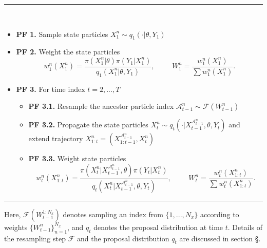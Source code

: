 \documentclass[a4paper,12pt]{article}
\begin{document}
\noindent \rule{\textwidth}{1pt}\\

\begin{itemize}
\item {\bf PF 1.} Sample state particles $X_1^n \sim q_1(\cdot \vert \theta, Y_1)$
\item {\bf PF 2.} Weight the state particles
\[ w_1^n (X_1^n) = \frac{\pi(X_1^n \vert \theta) \pi(Y_1 \vert X_1^n)}{q_1(X_1^n \vert \theta, Y_1)}, \hspace{1cm} W_1^{n} = \frac{w_1^n (X_1^n)}{\sum w_1^n (X_1^n)}.\]
\item {\bf PF 3.} For time index $t=2,...,T$
\begin{itemize}
\item {\bf PF 3.1.} Resample the ancestor particle index $\mathcal{A}_{t-1}^n \sim \mathcal{F}(W_{t-1}^n)$
\item {\bf PF 3.2.} Propagate the state particles $X_t^n \sim q_t(\cdot \vert X_{t-1}^{\mathcal{A}_{t-1}^n}, \theta, Y_t)$ and extend trajectory $X_{1:t}^n = \left(X_{1:t-1}^{\mathcal{A}_{t-1}^n}, X_t^n \right)$
\item {\bf PF 3.3.} Weight state particles
\[ w_t^n(X_{1:t}^n) = \frac{\pi(X_t^n \vert X_{t-1}^{\mathcal{A}_{t-1}^n}, \theta) \pi(Y_t \vert X_t^n)}{q_t(X_t^n \vert X_{t-1}^{\mathcal{A}_{t-1}^n}, \theta, Y_t)} , \hspace{1cm} W_t^n = \frac{w_t^n (X_{1:t}^n)}{\sum w_t^n (X_{1:t}^n)}. \]
\end{itemize}
\end{itemize}

\noindent \rule{\textwidth}{1pt}

\vspace{10pt}

\noindent Here, $\mathcal{F}(W_{t-1}^{1:N_x})$ denotes sampling an index from  $\{ 1,...,N_x\}$ according to weights $\{W_{t-1}^n\}_{n=1}^{N_x}$, and  $q_t$ denotes the proposal distribution at time $t$. Details of the resampling step $\mathcal{F}$ and the proposal distribution  $q_t$ are discussed in section \S.
\end{document}
